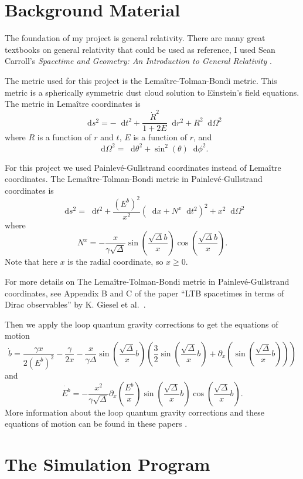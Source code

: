 \documentclass[12pt]{article}
\newcommand{\dd}{\mathop{}\!\mathrm{d}}
\begin{document}
\section{Background Material}

The foundation of my project is general relativity. There are many great textbooks on
general relativity that could be used as reference, I used Sean Carroll's
\textit{Spacetime and Geometry: An Introduction to General Relativity} \cite{gr}.

The metric used for this project is the Lema\^{i}tre-Tolman-Bondi metric. This metric is a
spherically symmetric dust cloud solution to Einstein's field equations. The metric in
Lema\^{i}tre coordinates is
\[ \dd s^2 = -\dd t^2 + \frac{\dot{R}^2}{1 + 2E} \dd r^2 + R^2\dd \Omega^2 \]
where $R$ is a function of $r$ and $t$, $E$ is a function of $r$, and
\[ \dd \Omega^2 = \dd \theta^2 + \sin^2(\theta)\dd \phi^2. \]

For this project we used Painlev\'{e}-Gullstrand coordinates instead of Lema\^{i}tre
coordinates. The Lema\^{i}tre-Tolman-Bondi metric in Painlev\'{e}-Gullstrand coordinates
is
\[ \dd s^2 = \dd t^2 + \frac{(E^b)^2}{x^2} (\dd x + N^x\dd t^2)^2 + x^2 \dd \Omega^2 \]
where
\[ N^x = -\frac{x}{\gamma\sqrt{\Delta}} \sin\left(\frac{\sqrt{\Delta}b}{x}\right)
\cos\left(\frac{\sqrt{\Delta}b}{x}\right). \]
Note that here $x$ is the radial coordinate, so $x \ge 0$.

For more details on The Lema\^{i}tre-Tolman-Bondi metric in Painlev\'{e}-Gullstrand
coordinates, see Appendix B and C of the paper ``LTB spacetimes in terms of Dirac
observables'' by K. Giesel et al.\ \cite{metric}.

Then we apply the loop quantum gravity corrections to get the equations of motion
\[ \dot{b} = \frac{\gamma x}{2(E^b)^2} - \frac{\gamma}{2x} - \frac{x}{\gamma\Delta}
\sin\left( \frac{\sqrt{\Delta}}{x}b \right) \left( \frac{3}{2}\sin\left(
\frac{\sqrt{\Delta}}{x}b \right) + \partial_x \left(
\sin\left(\frac{\sqrt{\Delta}}{x}b\right) \right) \right) \]
and
\[ \dot{E^b} = -\frac{x^2}{\gamma\sqrt{\Delta}} \partial_x \left( \frac{E^b}{x} \right)
\sin \left( \frac{\sqrt{\Delta}}{x}b \right) \cos \left( \frac{\sqrt{\Delta}}{x}b
\right). \]
More information about the loop quantum gravity corrections and these equations of
motion can be found in these papers \cite{lqg2, lqg1}.

\section{The Simulation Program}
\end{document}
